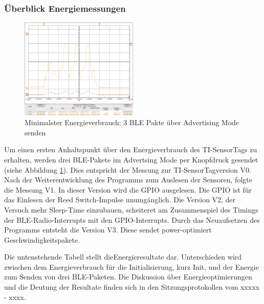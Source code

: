 \subsubsection{Überblick Energiemessungen}
\label{erst_EMessungen}

\begin{figure}[ht]
    \includegraphics[width=0.5\textwidth]{3Vorgehen/imag/v0Send33uJ.png} 
    \caption{Minimalster Energieverbrauch: 3 BLE Pakte über Advertising Mode senden}
    \label{BLE_send}
\end{figure}

Um einen ersten Anhaltspunkt über den Energieverbrauch des TI-SensorTags zu erhalten, werden drei BLE-Pakete im Advertsing Mode per Knopfdruck gesendet (siehe Abbildung \ref{BLE_send}). Dies entspricht der Messung zur TI-SensorTagversion V0. Nach der Weiterentwicklung des Programms zum Auslesen der Sensoren, folgte die Messung V1. In dieser Version wird die GPIO ausgelesen. Die GPIO ist für das Einlesen der Reed Switch-Impulse unumgänglich. Die Version V2, der Versuch mehr Sleep-Time einzubauen, scheiteret am Zusammenspiel des Timings der BLE-Radio-Interrupts mit den GPIO-Interrupts. Durch das Neuaufsetzen des Programms entsteht die Version V3. Diese sendet power-optimiert Geschwindigkeitspakete. 

Die untenstehende Tabell stellt dieEnergieresultate dar. Unterschieden wird zwischen dem Energieverbrauch für die Initialisierung, kurz Init, und der Energie zum Senden von drei BLE-Paketen. Die Diskussion über Energieoptimierungen und die Deutung der Resultate finden sich in den Sitzungsprotokollen vom xxxxx - xxxx. 


